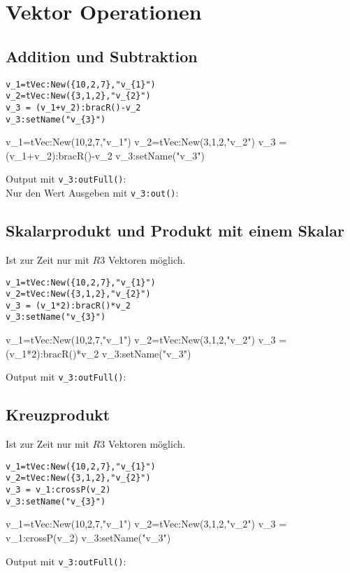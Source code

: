 \section{Vektor Operationen}
\subsection{Addition und Subtraktion}
\begin{lstlisting}
v_1=tVec:New({10,2,7},"v_{1}")
v_2=tVec:New({3,1,2},"v_{2}")
v_3 = (v_1+v_2):bracR()-v_2
v_3:setName("v_{3}")
\end{lstlisting}
\begin{luacode*}
	v_1=tVec:New({10,2,7},"v_{1}")
	v_2=tVec:New({3,1,2},"v_{2}")
	v_3 = (v_1+v_2):bracR()-v_2
	v_3:setName("v_{3}")
\end{luacode*}
Output mit \lstinline{v_3:outFull()}:
 \\
Nur den Wert Ausgeben mit \lstinline{v_3:out()}:
\subsection{Skalarprodukt und Produkt mit einem Skalar}
Ist zur Zeit nur mit $R3$ Vektoren möglich.
\begin{lstlisting}
v_1=tVec:New({10,2,7},"v_{1}")
v_2=tVec:New({3,1,2},"v_{2}")
v_3 = (v_1*2):bracR()*v_2
v_3:setName("v_{3}")
\end{lstlisting}
\begin{luacode*}
	v_1=tVec:New({10,2,7},"v_{1}")
	v_2=tVec:New({3,1,2},"v_{2}")
	v_3 = (v_1*2):bracR()*v_2
	v_3:setName("v_{3}")
\end{luacode*}
Output mit \lstinline{v_3:outFull()}:
\subsection{Kreuzprodukt}
Ist zur Zeit nur mit $R3$ Vektoren möglich.
\begin{lstlisting}
v_1=tVec:New({10,2,7},"v_{1}")
v_2=tVec:New({3,1,2},"v_{2}")
v_3 = v_1:crossP(v_2)
v_3:setName("v_{3}")
\end{lstlisting}
\begin{luacode*}
	v_1=tVec:New({10,2,7},"v_{1}")
	v_2=tVec:New({3,1,2},"v_{2}")
	v_3 = v_1:crossP(v_2)
	v_3:setName("v_{3}")
\end{luacode*}
Output mit \lstinline{v_3:outFull()}:

